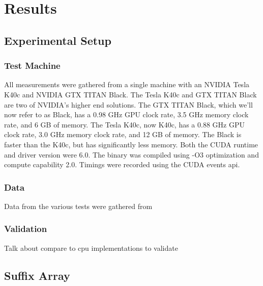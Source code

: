 \chapter{Results}
\label{chap:results}

\section{Experimental Setup}
\subsection{Test Machine}
All measurements were gathered from a single machine with an NVIDIA Tesla K40c and NVIDIA GTX TITAN Black.
The Tesla K40c and GTX TITAN Black are two of NVIDIA's higher end solutions.
The GTX TITAN Black, which we'll now refer to as Black, has a 0.98 GHz GPU clock rate, 3.5 GHz memory clock rate, and 6 GB of memory.
The Tesla K40c, now K40c, has a 0.88 GHz GPU clock rate, 3.0 GHz memory clock rate, and 12 GB of memory.
The Black is faster than the K40c, but has significantly less memory.
Both the CUDA runtime and driver version were 6.0.
The binary was compiled using -O3 optimization and compute capability 2.0.
Timings were recorded using the CUDA events api.

\subsection{Data}

Data from the various tests were gathered from 

\subsection{Validation}

Talk about compare to cpu implementations to validate

\section{Suffix Array}

